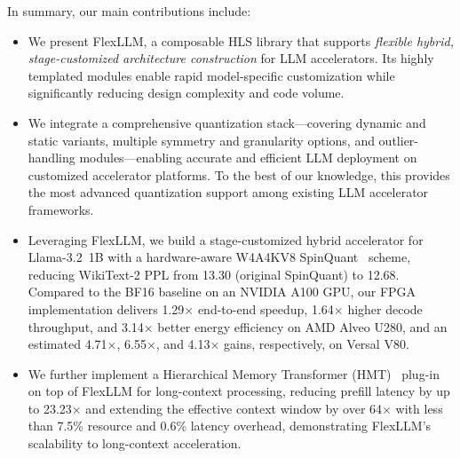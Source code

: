 \documentclass[conference]{IEEEtran}
\begin{document}
In summary, our main contributions include:
\begin{itemize}
    \item We present FlexLLM, a composable HLS library that supports \textit{flexible hybrid, stage-customized architecture construction} for LLM accelerators. Its highly templated modules enable rapid model-specific customization while significantly reducing design complexity and code volume.
    \item We integrate a comprehensive quantization stack---covering dynamic and static variants, multiple symmetry and granularity options, and outlier-handling modules---enabling accurate and efficient LLM deployment on customized accelerator platforms. To the best of our knowledge, this provides the most advanced quantization support among existing LLM accelerator frameworks.
    \item Leveraging FlexLLM, we build a stage-customized hybrid accelerator for Llama-3.2~1B with a hardware-aware W4A4KV8 SpinQuant~\cite{liu2024spinquant} scheme, reducing WikiText-2 PPL from 13.30 (original SpinQuant) to 12.68. Compared to the BF16 baseline on an NVIDIA A100 GPU, our FPGA implementation delivers 1.29$\times$ end-to-end speedup, 1.64$\times$ higher decode throughput, and 3.14$\times$ better energy efficiency on AMD Alveo U280, and an estimated 4.71$\times$, 6.55$\times$, and 4.13$\times$ gains, respectively, on Versal V80.
    \item We further implement a Hierarchical Memory Transformer (HMT)~\cite{he2024hmt} plug-in on top of FlexLLM for long-context processing, reducing prefill latency by up to 23.23$\times$ and extending the effective context window by over 64$\times$ with less than 7.5\% resource and 0.6\% latency overhead, demonstrating FlexLLM’s scalability to long-context acceleration.
\end{itemize}
\end{document}
